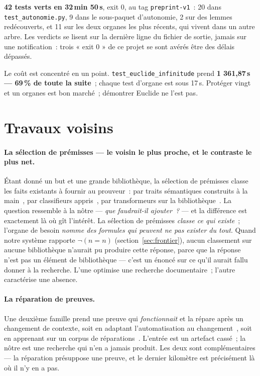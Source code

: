 \documentclass[11pt]{article}
\theoremstyle{remark}\newtheorem{remarque}{Remarque}
\begin{document}
\textbf{42 tests verts en 32\,min 50\,s}, exit 0, au tag \texttt{preprint-v1}~: 20 dans
\texttt{test\_autonomie.py}, 9 dans le sous-paquet d'autonomie, 2 sur des lemmes
redécouverts, et 11 sur les deux organes les plus récents, qui vivent dans un autre
arbre. Les verdicts se lisent sur la dernière ligne du fichier de sortie, jamais sur une
notification~: trois « exit 0 » de ce projet se sont avérés être des délais dépassés.

Le coût est concentré en un point. \texttt{test\_euclide\_infinitude} prend
\textbf{1 361,87\,s --- 69\,\% de toute la suite}~; chaque test d'organe est sous 17\,s.
Protéger vingt et un organes est bon marché~; démontrer Euclide ne l'est pas.

\section{Travaux voisins}
\label{sec:related}

\paragraph{La sélection de prémisses --- le voisin le plus proche, et le contraste le
plus net.} Étant donné un but et une grande bibliothèque, la sélection de prémisses
classe les faits existants à fournir au prouveur~: par traits sémantiques construits à la
main~\cite{kaliszyk2015features}, par classifieurs appris~\cite{alemi2016deepmath}, par
transformeurs sur la bibliothèque~\cite{mikula2023magnushammer}. La question ressemble à
la nôtre --- \emph{que faudrait-il ajouter~?} --- et la différence est exactement là où
gît l'intérêt. La sélection de prémisses \emph{classe ce qui existe}~; l'organe de besoin
\emph{nomme des formules qui peuvent ne pas exister du tout}. Quand notre système
rapporte $\neg(n = n)$ (section~\ref{sec:frontier}), aucun classement sur aucune
bibliothèque n'aurait pu produire cette réponse, parce que la réponse n'est pas un
élément de bibliothèque --- c'est un énoncé sur ce qu'il aurait fallu donner à la
recherche. L'une optimise une recherche documentaire~; l'autre caractérise une absence.

\paragraph{La réparation de preuves.} Une deuxième famille prend une preuve qui
\emph{fonctionnait} et la répare après un changement de contexte, soit en adaptant
l'automatisation au changement~\cite{ringer2018pumpkin}, soit en apprenant sur un corpus
de réparations~\cite{reichel2023proofrepair,april2026}. L'entrée est un artefact cassé~;
la nôtre est une recherche qui n'en a jamais produit. Les deux sont complémentaires ---
la réparation présuppose une preuve, et le dernier kilomètre est précisément là où il n'y
en a pas.
\end{document}
